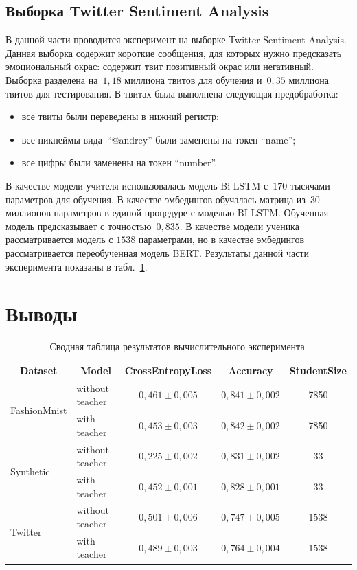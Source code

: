 \documentclass[12pt, twoside]{article}
\begin{document}
\subsection{Выборка Twitter Sentiment Analysis}
В данной части проводится эксперимент на выборке Twitter Sentiment Analysis. Данная выборка содержит короткие сообщения, для которых нужно предсказать эмоциональный окрас: содержит твит позитивный окрас или негативный. Выборка разделена на~$1{,}18$ миллиона твитов для обучения и~$0{,}35$ миллиона твитов для тестирования. В твитах была выполнена следующая предобработка:
\begin{itemize}
	\item все твиты были переведены в нижний регистр;
	\item все никнеймы вида~``@andrey'' были заменены на токен ``name'';
	\item все цифры были заменены на токен ``number''.
\end{itemize}
В качестве модели учителя использовалась модель Bi-LSTM с~$170$ тысячами параметров для обучения. В качестве эмбедингов обучалась матрица из~$30$ миллионов параметров в единой процедуре с моделью BI-LSTM. Обученная модель предсказывает с точностью~$0{,}835$. В качестве модели ученика рассматривается модель с $1538$ параметрами, но в качестве эмбедингов рассматривается переобученная модель BERT. Результаты данной части эксперимента показаны в табл.~\ref{tb:ce:1}.


\section{Выводы}
\begin{table}[]
\begin{center}
\begin{tabular}{|l|l|c|c|c|}
\hline
\multicolumn{1}{|c|}{Dataset} & \multicolumn{1}{c|}{Model} & CrossEntropyLoss      & Accuracy    &   StudentSize   \\ \hline
\multirow{2}{*}{FashionMnist} & without teacher    &  $0{,}461 \pm 0{,}005$ & $0{,}841\pm 0{,}002$ & 7850 \\ \cline{2-5} 
                              & with teacher       & $0{,}453 \pm 0{,}003$ & $0{,}842 \pm 0{,}002$ & 7850\\ \hline
\multirow{2}{*}{Synthetic}    & without teacher    & $0{,}225 \pm 0{,}002$ & $0{,}831\pm 0{,}002$ & 33 \\ \cline{2-5} 
                              &  with teacher       & $0{,}452 \pm 0{,}001$   & $0{,}828\pm 0{,}001$ & 33 \\ \hline
\multirow{2}{*}{Twitter }    & without teacher    & $0{,}501 \pm 0{,}006$ & $0{,}747\pm 0{,}005$ & $1538$  \\ \cline{2-5} 
                              &with teacher       & $0{,}489 \pm 0{,}003$   & $0{,}764\pm 0{,}004$ & $1538$ \\ \hline
\end{tabular}
\caption{Сводная таблица результатов вычислительного эксперимента.}
\label{tb:ce:1}
\end{center}
\end{table}
\end{document}
